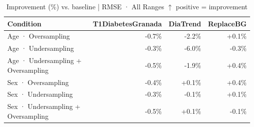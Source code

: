 \begin{table}[htbp]
\centering
\small
\caption{Improvement (\%) vs. baseline  |  RMSE · All Ranges  $\uparrow$ positive = improvement}
\label{tab:delta_rmse_entire_family_mechanism_random}
\begin{tabular}{lrrr}
\toprule
\textbf{Condition} & \textbf{T1DiabetesGranada} & \textbf{DiaTrend} & \textbf{ReplaceBG} \\
\midrule
Age · Oversampling & \textcolor{BrickRed}{-0.7\%} & \textcolor{BrickRed}{-2.2\%} & \textcolor{OliveGreen}{+0.1\%} \\
Age · Undersampling & \textcolor{BrickRed}{-0.3\%} & \textcolor{BrickRed}{-6.0\%} & \textcolor{BrickRed}{-0.3\%} \\
Age · Undersampling + Oversampling & \textcolor{BrickRed}{-0.5\%} & \textcolor{BrickRed}{-1.9\%} & \textcolor{OliveGreen}{+0.4\%} \\
\midrule
Sex · Oversampling & \textcolor{BrickRed}{-0.4\%} & \textcolor{OliveGreen}{+0.1\%} & \textcolor{OliveGreen}{+0.4\%} \\
Sex · Undersampling & \textcolor{BrickRed}{-0.3\%} & \textcolor{BrickRed}{-0.1\%} & \textcolor{OliveGreen}{+0.1\%} \\
Sex · Undersampling + Oversampling & \textcolor{BrickRed}{-0.5\%} & \textcolor{OliveGreen}{+0.1\%} & \textcolor{BrickRed}{-0.1\%} \\
\bottomrule
\end{tabular}
\end{table}